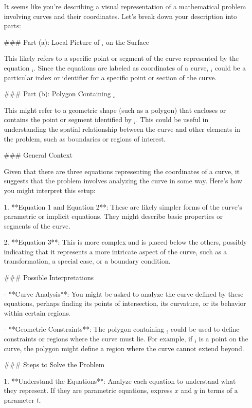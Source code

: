 It seems like you're describing a visual representation of a mathematical problem involving curves and their coordinates. Let's break down your description into parts:

### Part (a): Local Picture of \(_i\) on the Surface

This likely refers to a specific point or segment of the curve represented by the equation \(_i\). Since the equations are labeled as coordinates of a curve, \(_i\) could be a particular index or identifier for a specific point or section of the curve.

### Part (b): Polygon Containing \(_i\)

This might refer to a geometric shape (such as a polygon) that encloses or contains the point or segment identified by \(_i\). This could be useful in understanding the spatial relationship between the curve and other elements in the problem, such as boundaries or regions of interest.

### General Context

Given that there are three equations representing the coordinates of a curve, it suggests that the problem involves analyzing the curve in some way. Here’s how you might interpret this setup:

1. **Equation 1 and Equation 2**: These are likely simpler forms of the curve's parametric or implicit equations. They might describe basic properties or segments of the curve.
   
2. **Equation 3**: This is more complex and is placed below the others, possibly indicating that it represents a more intricate aspect of the curve, such as a transformation, a special case, or a boundary condition.

### Possible Interpretations

- **Curve Analysis**: You might be asked to analyze the curve defined by these equations, perhaps finding its points of intersection, its curvature, or its behavior within certain regions.
  
- **Geometric Constraints**: The polygon containing \(_i\) could be used to define constraints or regions where the curve must lie. For example, if \(_i\) is a point on the curve, the polygon might define a region where the curve cannot extend beyond.

### Steps to Solve the Problem

1. **Understand the Equations**: Analyze each equation to understand what they represent. If they are parametric equations, express \(x\) and \(y\) in terms of a parameter \(t\).

